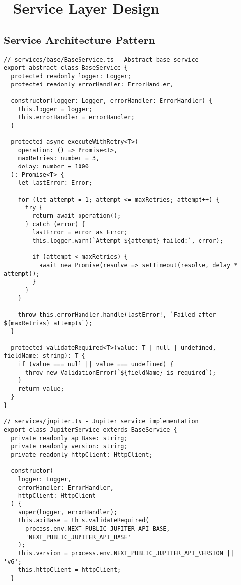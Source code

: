 \documentclass[11pt,a4paper]{article}
\begin{document}
\section{🔧 Service Layer Design}

\subsection{Service Architecture Pattern}

\begin{lstlisting}[style=typescript, caption=Service Layer Architecture]
// services/base/BaseService.ts - Abstract base service
export abstract class BaseService {
  protected readonly logger: Logger;
  protected readonly errorHandler: ErrorHandler;
  
  constructor(logger: Logger, errorHandler: ErrorHandler) {
    this.logger = logger;
    this.errorHandler = errorHandler;
  }
  
  protected async executeWithRetry<T>(
    operation: () => Promise<T>,
    maxRetries: number = 3,
    delay: number = 1000
  ): Promise<T> {
    let lastError: Error;
    
    for (let attempt = 1; attempt <= maxRetries; attempt++) {
      try {
        return await operation();
      } catch (error) {
        lastError = error as Error;
        this.logger.warn(`Attempt ${attempt} failed:`, error);
        
        if (attempt < maxRetries) {
          await new Promise(resolve => setTimeout(resolve, delay * attempt));
        }
      }
    }
    
    throw this.errorHandler.handle(lastError!, `Failed after ${maxRetries} attempts`);
  }
  
  protected validateRequired<T>(value: T | null | undefined, fieldName: string): T {
    if (value === null || value === undefined) {
      throw new ValidationError(`${fieldName} is required`);
    }
    return value;
  }
}

// services/jupiter.ts - Jupiter service implementation
export class JupiterService extends BaseService {
  private readonly apiBase: string;
  private readonly version: string;
  private readonly httpClient: HttpClient;
  
  constructor(
    logger: Logger,
    errorHandler: ErrorHandler,
    httpClient: HttpClient
  ) {
    super(logger, errorHandler);
    this.apiBase = this.validateRequired(
      process.env.NEXT_PUBLIC_JUPITER_API_BASE,
      'NEXT_PUBLIC_JUPITER_API_BASE'
    );
    this.version = process.env.NEXT_PUBLIC_JUPITER_API_VERSION || 'v6';
    this.httpClient = httpClient;
  }
  

\end{lstlisting}
\end{document}
